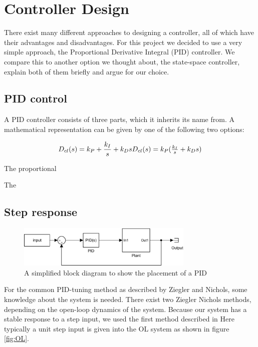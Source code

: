 \chapter{Controller Design}\label{ch:controldesign}
There exist many different approaches to designing a controller,
all of which have their advantages and disadvantages.
For this project we decided to use a very simple approach,
the Proportional Derivative Integral (PID) controller.
We compare this to another option we thought about,
the state-space controller, explain both of them briefly
and argue for our choice.

\section{PID control}\label{sec:PID}
A PID controller consists of three parts,
which it inherits its name from.
A mathematical representation can be given by one of the following two options:

\begin{equation}
	  D_{cl}(s) = k_P + \frac{k_I}{s} + k_D s$$
	$$D_{cl}(s) = k_P ( \frac{k_I}{s} + k_D s)
	 \label{eq:PID}
\end{equation}

The proportional 

The 

\section{Step response}
\begin{figure}[H]
    \centering
    \includegraphics[width=0.75\textwidth]{figures/04ExperimentsAndLabWork/CLblock.pdf}
    \caption{A simplified block diagram to show the placement of a PID}
	\label{fig:PIDplace}
\end{figure}

For the common PID-tuning method as described by Ziegler and Nichols,
some knowledge about the system is needed.
There exist two Ziegler Nichols methods,
depending on the open-loop dynamics of the system.
Because our system has a stable response to a step input, we used the first method described in 
Here typically a unit step input is given into the OL system as shown in figure \ref{fig:OL}.

